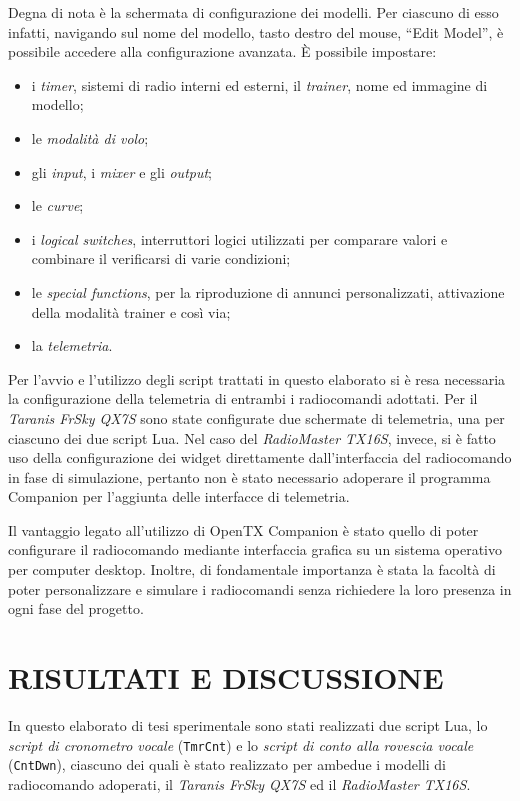 \documentclass[a4paper, 12pt]{report} %
\begin{document}
Degna di nota è la schermata di configurazione dei modelli. Per ciascuno di esso infatti, navigando sul nome del modello, tasto destro del mouse, ``Edit Model'', è possibile accedere alla configurazione avanzata. È possibile impostare:
\begin{itemize}
        \item   i \emph{timer}, sistemi di radio interni ed esterni, il \emph{trainer}, nome ed immagine di modello;
        \item   le \emph{modalità di volo};
        \item   gli \emph{input}, i \emph{mixer} e gli \emph{output};
        \item   le \emph{curve};
        \item   i \emph{logical switches}, interruttori logici utilizzati per comparare valori e combinare il verificarsi di varie condizioni;
        \item   le \emph{special functions}, per la riproduzione di annunci personalizzati, attivazione della modalità trainer e così via;
        \item   la \emph{telemetria}.
\end{itemize}

Per l'avvio e l'utilizzo degli script trattati in questo elaborato si è resa necessaria la configurazione della telemetria di entrambi i radiocomandi adottati. Per il \emph{Taranis FrSky QX7S} sono state configurate due schermate di telemetria, una per ciascuno dei due script Lua. Nel caso del \emph{RadioMaster TX16S}, invece, si è fatto uso della configurazione dei widget direttamente dall'interfaccia del radiocomando in fase di simulazione, pertanto non è stato necessario adoperare il programma Companion per l'aggiunta delle interfacce di telemetria.

Il vantaggio legato all'utilizzo di OpenTX Companion è stato quello di poter configurare il radiocomando mediante interfaccia grafica su un sistema operativo per computer desktop. Inoltre, di fondamentale importanza è stata la facoltà di poter personalizzare e simulare i radiocomandi senza richiedere la loro presenza in ogni fase del progetto.

\clearpage

\chapter{RISULTATI E DISCUSSIONE}
In questo elaborato di tesi sperimentale sono stati realizzati due script Lua, lo \emph{script di cronometro vocale} (\texttt{TmrCnt}) e lo \emph{script di conto alla rovescia vocale} (\texttt{CntDwn}), ciascuno dei quali è stato realizzato per ambedue i modelli di radiocomando adoperati, il \emph{Taranis FrSky QX7S} ed il \emph{RadioMaster TX16S}.
\end{document}
